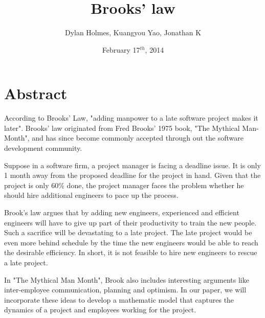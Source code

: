 \documentclass{article}
\author{Dylan Holmes, Kuangyou Yao, Jonathan K}
\title{Brooks' law}
\date{February 17$^{th}$, 2014}
\begin{document}
\maketitle

\section*{Abstract}
According to Brooks' Law, "adding manpower to a late software project makes it later". Brooks' law originated from Fred Brooks' 1975 book, "The Mythical Man-Month", and has since become commonly accepted through out the software development community. 

Suppose in a software firm, a project manager is facing a deadline issue. It is only 1 month away from the proposed deadline for the project in hand. Given that the project is only 60\% done, the project manager faces the problem whether he should hire additional engineers to pace up the process.

Brook’s law argues that by adding new engineers, experienced and efficient engineers will have to give up part of their productivity to train the new people. Such a sacrifice will be devastating to a late project. The late project would be even more behind schedule by the time the new engineers would be able to reach the desirable efficiency. In short, it is not feasible to hire new engineers to rescue a late project.

In "The Mythical Man Month", Brook also includes interesting arguments like inter-employee communication, planning and optimism. In our paper, we will incorporate these ideas to develop a mathematic model that captures the dynamics of a project and employees working for the project.
\end{document}
